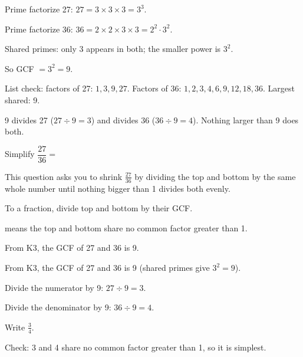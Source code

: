 \begin{steps}
  \item Prime factorize 27: $27 = 3 \times 3 \times 3 = 3^{3}$.
  \item Prime factorize 36: $36 = 2 \times 2 \times 3 \times 3 = 2^{2} \cdot 3^{2}$.
  \item Shared primes: only 3 appears in both; the smaller power is $3^{2}$.
  \item So GCF $= 3^{2} = 9$.
  \item List check: factors of 27: $1, 3, 9, 27$. Factors of 36: $1, 2, 3, 4, 6, 9, 12, 18, 36$. Largest shared: 9.
\end{steps}


9 divides 27 ($27 \div 9 = 3$) and divides 36 ($36 \div 9 = 4$). Nothing larger than 9 does both.


Simplify $\dfrac{27}{36} = $\ansblank


This question asks you to shrink $\tfrac{27}{36}$ by dividing the top and bottom by the same whole number until nothing bigger than 1 divides both evenly.

\begin{words}
  \item To a fraction, divide top and bottom by their GCF.
  \item {}means the top and bottom share no common factor greater than 1.
  \item From K3, the GCF of 27 and 36 is 9.
\end{words}

\begin{steps}
  \item From K3, the GCF of 27 and 36 is 9 (shared primes give $3^{2} = 9$).
  \item Divide the numerator by 9: $27 \div 9 = 3$.
  \item Divide the denominator by 9: $36 \div 9 = 4$.
  \item Write $\tfrac{3}{4}$.
  \item Check: 3 and 4 share no common factor greater than 1, so it is simplest.
\end{steps}

